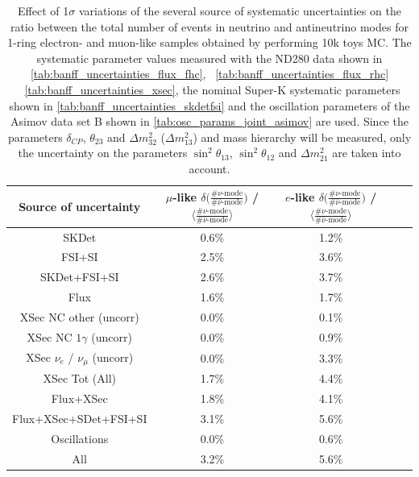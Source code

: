 

















\begin{table}
\center
\begin{tabular}{| c || c | c || c | c |}
\hline
Source of uncertainty 
&$\mu$-like ${\delta} \Big( \frac{\# {\nu} \text{-mode}}{\# {\bar{\nu}} \text{-mode} } \Big) $ / $\Big \langle \frac{\# {\nu} \text{-mode}}{\# {\bar{\nu}} \text{-mode} } \Big \rangle$ 
&$e$-like ${\delta} \Big( \frac{\# {\nu} \text{-mode}}{\# {\bar{\nu}} \text{-mode} } \Big) $ / $\Big \langle \frac{\# {\nu} \text{-mode}}{\# {\bar{\nu}} \text{-mode} } \Big \rangle$ \\

\hline
SKDet & 0.6\% & 1.2\% \\ \hline
FSI+SI & 2.5\%  & 3.6\% \\ \hline
SKDet+FSI+SI & 2.6\% & 3.7\% \\ \hline
\hline
Flux & 1.6\%  & 1.7\% \\ \hline
XSec NC other (uncorr)  & 0.0\%  & 0.1\% \\ \hline
XSec NC $1\gamma$ (uncorr)  & 0.0\%  & 0.9\% \\ \hline
XSec $\nu_e$ / $\nu_{\mu}$ (uncorr)  & 0.0\%  & 3.3\% \\ \hline
XSec Tot (All) & 1.7\%  & 4.4\% \\ \hline
 \hline
Flux+XSec  & 1.8\%  & 4.1\% \\ \hline
 \hline
Flux+XSec+SDet+FSI+SI  & 3.1\%  & 5.6\% \\ \hline
 \hline
Oscillations  & 0.0\%  & 0.6\% \\ \hline
 \hline
All  & 3.2\%  & 5.6\% \\ \hline

\end{tabular}
\caption{
 Effect of 1$\sigma$ variations of the several source of systematic uncertainties 
 on the ratio between the
 total number of events in neutrino and antineutrino modes
 for 1-ring electron- and muon-like samples
 obtained by performing 10k toys MC.
 The systematic parameter values measured with the ND280 data 
shown in 
\cref{tab:banff_uncertainties_flux_fhc},
~\ref{tab:banff_uncertainties_flux_rhc}
~\ref{tab:banff_uncertainties_xsec},
the nominal Super-K systematic parameters shown in \cref{tab:banff_uncertainties_skdetfsi}
and the oscillation parameters of the Asimov data set B shown in \cref{tab:osc_params_joint_asimov}
are used.
Since the parameters $\delta_{CP}$, $\theta_{23}$ and $\Delta m^2_{32}$ ($\Delta m^2_{13}$) and mass hierarchy
will be measured,
only the uncertainty on the parameters 
$\sin^2 \theta_{13}$,
$\sin^2 \theta_{12}$
and 
$\Delta m^2_{21}$ 
are taken into account.
}             
\label{tab:ratio_systematic_table_summary_asimov_B}                                                                                                                                                                             
\end{table}
